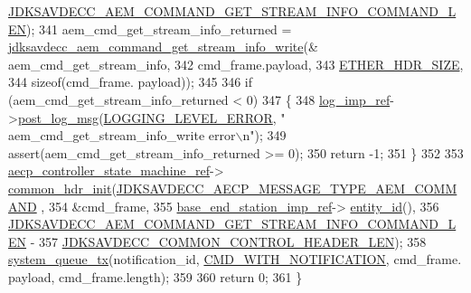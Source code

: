 \begin{DoxyCode}
      \hyperlink{group__command__get__stream__info_gaae48a0ac802bc8fdeaacfa15f4679e2a}{JDKSAVDECC\_AEM\_COMMAND\_GET\_STREAM\_INFO\_COMMAND\_LEN});
341     aem\_cmd\_get\_stream\_info\_returned = 
      \hyperlink{group__command__get__stream__info_gadc285f26ae5f9e8931b21e4712684f1a}{jdksavdecc\_aem\_command\_get\_stream\_info\_write}(&
      aem\_cmd\_get\_stream\_info,
342                                                                                     cmd\_frame.payload,
343                                                                                     
      \hyperlink{namespaceavdecc__lib_a6c827b1a0d973e18119c5e3da518e65ca9512ad9b34302ba7048d88197e0a2dc0}{ETHER\_HDR\_SIZE},
344                                                                                     \textcolor{keyword}{sizeof}(cmd\_frame.
      payload));
345 
346     \textcolor{keywordflow}{if} (aem\_cmd\_get\_stream\_info\_returned < 0)
347     \{
348         \hyperlink{namespaceavdecc__lib_acbe3e2a96ae6524943ca532c87a28529}{log\_imp\_ref}->\hyperlink{classavdecc__lib_1_1log_a68139a6297697e4ccebf36ccfd02e44a}{post\_log\_msg}(\hyperlink{namespaceavdecc__lib_a501055c431e6872ef46f252ad13f85cdaf2c4481208273451a6f5c7bb9770ec8a}{LOGGING\_LEVEL\_ERROR}, \textcolor{stringliteral}{"
      aem\_cmd\_get\_stream\_info\_write error\(\backslash\)n"});
349         assert(aem\_cmd\_get\_stream\_info\_returned >= 0);
350         \textcolor{keywordflow}{return} -1;
351     \}
352 
353     \hyperlink{namespaceavdecc__lib_a0b1b5aea3c0490f77cbfd9178af5be22}{aecp\_controller\_state\_machine\_ref}->
      \hyperlink{classavdecc__lib_1_1aecp__controller__state__machine_aafc737d7ed17a62fed9df6528f18d3ec}{common\_hdr\_init}(\hyperlink{group__aecp__message__type_ga4625ce189cc209f42deb0629f48faf69}{JDKSAVDECC\_AECP\_MESSAGE\_TYPE\_AEM\_COMMAND}
      ,
354                                                        &cmd\_frame,
355                                                        \hyperlink{classavdecc__lib_1_1descriptor__base__imp_a550c969411f5f3b69f55cc139763d224}{base\_end\_station\_imp\_ref}->
      \hyperlink{classavdecc__lib_1_1end__station__imp_a363b6c9664a0d701def9b17863e20ad3}{entity\_id}(),
356                                                        
      \hyperlink{group__command__get__stream__info_gaae48a0ac802bc8fdeaacfa15f4679e2a}{JDKSAVDECC\_AEM\_COMMAND\_GET\_STREAM\_INFO\_COMMAND\_LEN} -
357                                                            
      \hyperlink{group__jdksavdecc__avtp__common__control__header_gaae84052886fb1bb42f3bc5f85b741dff}{JDKSAVDECC\_COMMON\_CONTROL\_HEADER\_LEN});
358     \hyperlink{namespaceavdecc__lib_a6dd511685627c0865a3442b539a4e8e9}{system\_queue\_tx}(notification\_id, \hyperlink{namespaceavdecc__lib_aabcadff06aa62be0ce47bc0646823604aba48b8a017e06fb240b650cdea965178}{CMD\_WITH\_NOTIFICATION}, cmd\_frame.
      payload, cmd\_frame.length);
359 
360     \textcolor{keywordflow}{return} 0;
361 \}
\end{DoxyCode}


